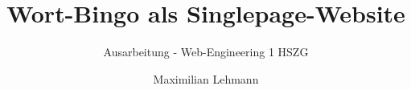 \documentclass[12pt german]{scrartcl}
\title{Wort-Bingo als Singlepage-Website}
\subtitle{Ausarbeitung - Web-Engineering 1 HSZG}
\author{Maximilian Lehmann}
\begin{document}
\maketitle

\begin{abstract}
	
\end{abstract}

\newpage
\tableofcontents

\section{}
\end{document}
